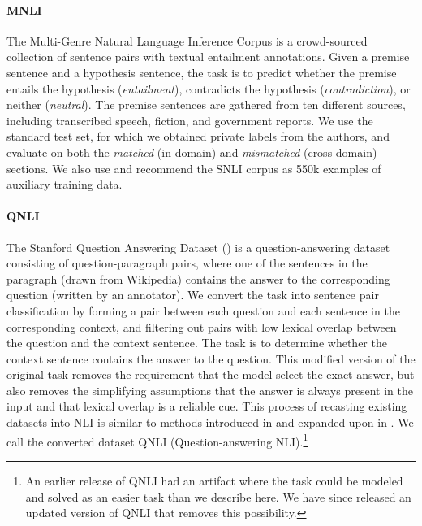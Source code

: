 \paragraph{MNLI}
The Multi-Genre Natural Language Inference Corpus \citep{DBLP:journals/corr/WilliamsNB17} is a crowd-sourced collection of sentence pairs with textual entailment annotations. Given a premise sentence and a hypothesis sentence, the task is to predict whether the premise entails the hypothesis (\textit{entailment}), contradicts the hypothesis (\textit{contradiction}), or neither (\textit{neutral}). The premise sentences are gathered from ten different sources, including transcribed speech, fiction, and government reports. We use the standard test set, for which we obtained private labels from the authors, and evaluate on both the \textit{matched} (in-domain) and \textit{mismatched} (cross-domain) sections. We also use and recommend the SNLI corpus \citep{bowman2015large} as 550k examples of auxiliary training data. %

\paragraph{QNLI}
The Stanford Question Answering Dataset (\citealt{rajpurkar2016squad}) is a question-answering dataset consisting of question-paragraph pairs, where one of the sentences in the paragraph (drawn from Wikipedia) contains the answer to the corresponding question (written by an annotator). We convert the task into sentence pair classification by forming a pair between each question and each sentence in the corresponding context, and filtering out pairs with low lexical overlap between the question and the context sentence. The task is to determine whether the context sentence contains the answer to the question. This modified version of the original task removes the requirement that the model select the exact answer, but also removes the simplifying assumptions that the answer is always present in the input and that lexical overlap is a reliable cue.
This process of recasting existing datasets into NLI is similar to methods introduced in \citet{white2017inference} and expanded upon in \citet{demszky2018transforming}.
We call the converted dataset QNLI (Question-answering NLI).\footnote{An earlier release of QNLI had an artifact where the task could be modeled and solved as an easier task than we describe here. We have since released an updated version of QNLI that removes this possibility.}

